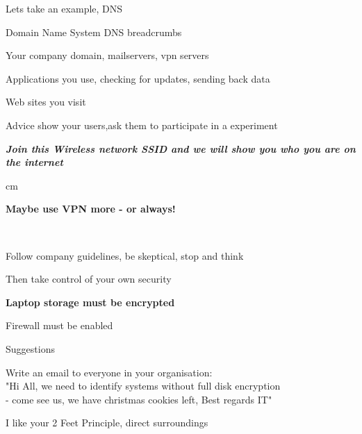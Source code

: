 \documentclass[Screen16to9,17pt,footrule]{foils}
\begin{document}

\begin{list1}
\item Lets take an example, DNS
\item Domain Name System DNS breadcrumbs
\begin{list2}
\item Your company domain, mailservers, vpn servers
\item Applications you use, checking for updates, sending back data
\item Web sites you visit
\end{list2}
\vskip 1cm
\item Advice show your users,ask them to participate in a experiment
\end{list1}

\emph{\bf Join this Wireless network SSID and we will show you who you are on the internet}

 cm
\centerline{\bf\Large Maybe use VPN more - or always!}




{~}

\begin{list1}
\item Follow company guidelines, be skeptical, stop and think
\item Then take control of your own security
\item {\bf Laptop storage must be encrypted}
\item Firewall must be enabled
\item Suggestions
\begin{list2}
\item Write an email to everyone in your organisation:\\
"Hi All, we need to identify systems without full disk encryption \\
- come see us, we have christmas cookies left, Best regards IT"
\end{list2}
\vskip 5mm
\item I like your 2 Feet Principle, direct surroundings
\end{list1}



\end{document}
